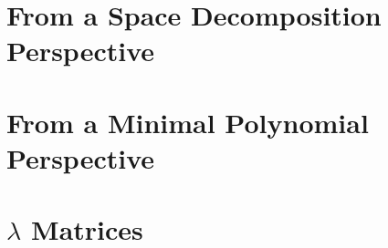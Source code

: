 

\section{From a Space Decomposition Perspective}


\section{From a Minimal Polynomial Perspective}


\section{$\lambda$ Matrices}



